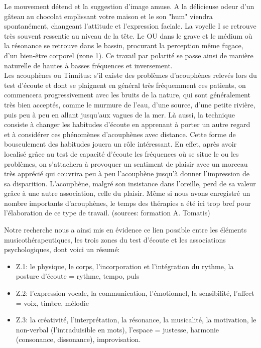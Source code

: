 Le mouvement détend et la suggestion d'image amuse. A la délicieuse odeur d'un gâteau au 
chocolat emplissant  votre maison et le son "hum" viendra spontanément, changeant l'attitude et 
l'expression faciale.
La voyelle I se retrouve très souvent ressentie au niveau de la tête.
Le OU dans le grave et le médium où la résonance se retrouve dans le bassin, procurant la perception 
même fugace, d'un bien-être corporel (zone 1).
Ce travail par polarité se passe ainsi de manière naturelle de hautes à basses fréquences et inversement. 
	\\
Les acouphènes ou Tinnitus: 
s'il existe des problèmes d'acouphènes relevés lors du test d'écoute et  dont se plaignent en général 
très fréquemment ces patients, on 
commencera progressivement avec les bruits 
de la nature, qui sont généralement très bien acceptés, comme le murmure de l'eau, d'une source, d'une 
petite rivière, puis peu à peu  en allant jusqu'aux vagues de la mer. Là aussi, la technique consiste à 
changer les habitudes d'écoute en apprenant à porter un autre regard et  à  
considérer ces phénomènes d'acouphènes avec distance. Cette forme de bousculement des habitudes  
jouera un rôle intéressant. En effet, après avoir localisé grâce au test de capacité d'écoute les 
fréquences où se situe le ou les problèmes, on s'attachera à provoquer un sentiment de plaisir avec un 
morceau très apprécié qui couvrira peu à peu l'acouphène jusqu'à donner l'impression de sa 
disparition. L'acouphène, malgré son insistance dans l'oreille, perd de sa valeur grâce à une autre 
association, celle du plaisir. Même si nous avons enregistré un nombre importants d'acouphènes, le 
temps des thérapies a été ici trop bref pour l'élaboration de ce type de travail. (sources: formation A. 
Tomatis)

   Notre recherche nous a ainsi mis en évidence ce lien possible entre 
 les éléments musicothérapeutiques, les trois zones du
	test d'écoute et les associations psychologiques, dont voici un résumé:
 
\begin{itemize}
	\item  Z.1: le physique, le corps, l'incorporation et
	l'intégration du rythme,
	la posture d'écoute  =  rythme, tempo, puls
	\item  Z.2:  l'expression vocale, la communication,
	l'émotionnel, la sensibilité, l'affect = voix, timbre, mélodie
	\item Z.3: la créativité, l'interprétation, la
	résonance, la musicalité, la motivation, le non-verbal (l'intraduisible en mots), l'espace = justesse, 
	harmonie (consonance,
	dissonance), improvisation.
\end{itemize}

